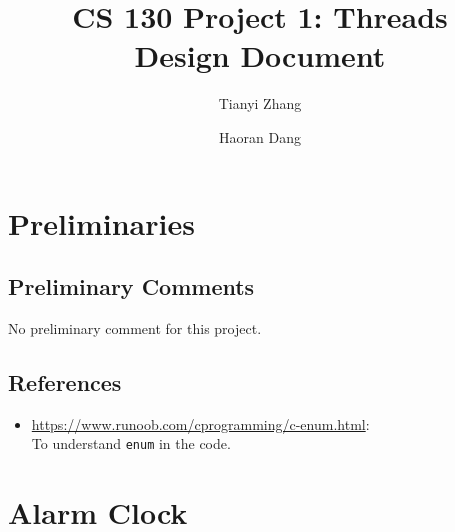 \documentclass[sigconf, nonacm, balance=false, urlbreakonhyphens=true]{acmart}
\begin{document}
    \title{CS 130 Project 1: Threads\\Design Document}

    \author{Tianyi Zhang}

    \author{Haoran Dang}

    \maketitle

    \setcounter{section}{-1}

    \section{Preliminaries}
        \subsection{Preliminary Comments}

        No preliminary comment for this project. 

        \subsection{References}
        
            \begin{itemize}
                \item \url{https://www.runoob.com/cprogramming/c-enum.html}: \\To understand \texttt{enum} in the code. 
            \end{itemize} 
    
    \section{Alarm Clock}
            
\end{document}
